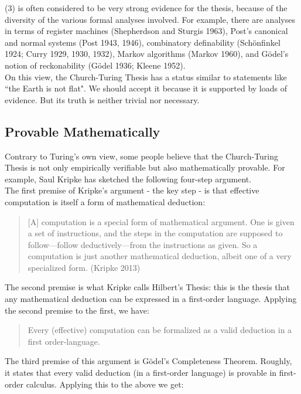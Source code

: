 \documentclass[11pt]{article}
\theoremstyle{definition}
\begin{document}
(3) is often considered to be very strong evidence for the thesis, because of the diversity of the various formal analyses involved.  For example, there are analyses in terms of register machines (Shepherdson and Sturgis 1963), Post’s canonical and normal systems (Post 1943, 1946), combinatory definability (Schönfinkel 1924; Curry 1929, 1930, 1932), Markov algorithms (Markov 1960), and Gödel’s notion of reckonability (Gödel 1936; Kleene 1952). \\

On this view, the Church-Turing Thesis has a status similar to statements like ``the Earth is not flat". We should accept it because it is supported by loads of evidence. But its truth is neither trivial nor necessary.

\subsection{Provable Mathematically}

Contrary to Turing's own view, some people believe that the Church-Turing Thesis is not only empirically verifiable but also mathematically provable. For example, Saul Kripke has sketched the following four-step argument. \\

The first premise of Kripke's argument - the key step - is that effective computation is itself a form of mathematical deduction:

\begin{quote}
[A] computation is a special form of mathematical argument. One is given a set of instructions, and the steps in the computation are supposed to follow—follow deductively—from the instructions as given. So a computation is just another mathematical deduction, albeit one of a very specialized form. (Kripke 2013)
\end{quote}

The second premise is what Kripke calls Hilbert's Thesis: this is the thesis that any mathematical deduction can be expressed in a first-order language. Applying the second premise to the first, we have:

\begin{quote}
Every (effective) computation can be formalized as a valid deduction in a first order-language.
\end{quote}

The third premise of this argument is G\"odel's Completeness Theorem. Roughly, it states that every valid deduction (in a first-order language) is provable in first-order calculus. Applying this to the above we get:
\end{document}
